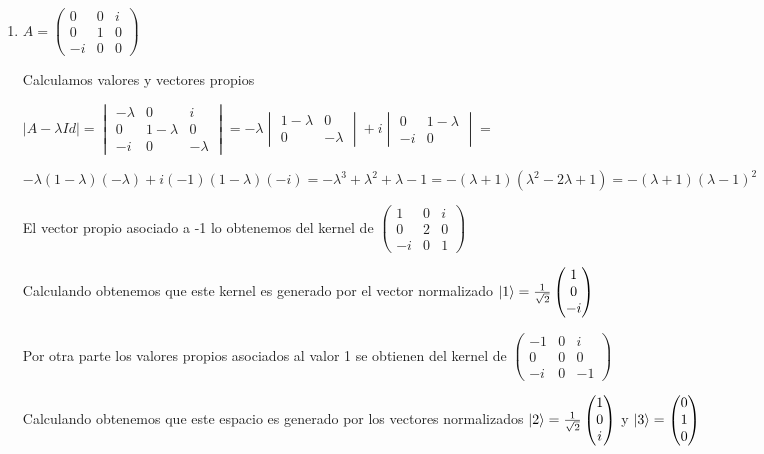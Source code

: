 \documentclass[letter,twoside,12pt]{article}
\begin{document}
\begin{enumerate}
\item $ A = \begin{pmatrix}
0 & 0 & i
\\0 & 1 & 0
\\ -i & 0 & 0
\end{pmatrix}
 $
 
 Calculamos valores y vectores propios
 
 $ |A-\lambda Id| = \begin{vmatrix}
-\lambda & 0 & i
\\ 0 & 1 - \lambda & 0
\\ -i & 0 & -\lambda
\end{vmatrix} =
-\lambda\begin{vmatrix}
1-\lambda & 0
\\0 & -\lambda
\end{vmatrix} + i \begin{vmatrix}
0 & 1-\lambda
\\-i & 0
\end{vmatrix} =$

$ - \lambda(1-\lambda)(- \lambda)+i(-1)(1-\lambda)(-i) = -\lambda^3+\lambda^2+\lambda-1 = -(\lambda+1)(\lambda^2-2\lambda+1)=-(\lambda+1)(\lambda-1)^2$

El vector propio asociado a -1 lo obtenemos del kernel de
$ \begin{pmatrix} 
1 & 0 & i
\\ 0 & 2 & 0
\\ -i & 0 & 1
\end{pmatrix}  $

Calculando obtenemos que este kernel es generado por el vector normalizado $ \ket{1}=\frac{1}{\sqrt{2}}\begin{pmatrix}
1
\\0
\\-i
\end{pmatrix} $

Por otra parte los valores propios asociados al valor 1 se obtienen del kernel de $ \begin{pmatrix}
-1 & 0 & i
\\0 &0 & 0
\\-i & 0 & -1
\end{pmatrix} $

Calculando obtenemos que este espacio es generado por los vectores normalizados $ \ket{2} = \frac{1}{\sqrt{2}}\begin{pmatrix}
1  \\ 0 \\ i
\end{pmatrix} $ y  $ \ket{3}=\begin{pmatrix}
0  \\ 1 \\ 0
\end{pmatrix} $ 


\end{enumerate}
\end{document}
